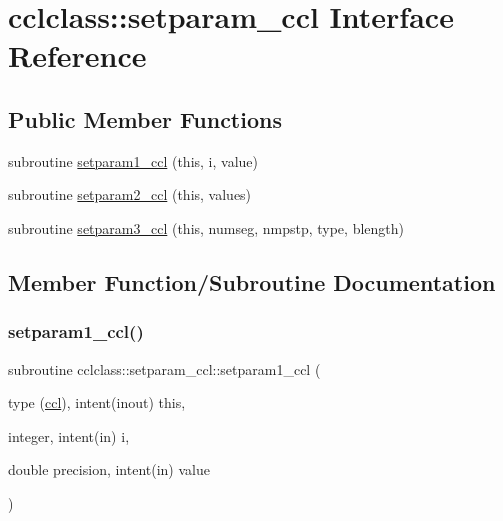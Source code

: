 \hypertarget{interfacecclclass_1_1setparam__ccl}{}\section{cclclass\+::setparam\+\_\+ccl Interface Reference}
\label{interfacecclclass_1_1setparam__ccl}
\subsection*{Public Member Functions}
\begin{DoxyCompactItemize}
\item 
subroutine \mbox{\hyperlink{interfacecclclass_1_1setparam__ccl_a3214f1704a32f32833b333495742befe}{setparam1\+\_\+ccl}} (this, i, value)
\item 
subroutine \mbox{\hyperlink{interfacecclclass_1_1setparam__ccl_a7221337eb59d3a666420ae8fc1878f9d}{setparam2\+\_\+ccl}} (this, values)
\item 
subroutine \mbox{\hyperlink{interfacecclclass_1_1setparam__ccl_a3cee72fa39bab552f147f7adb9ea942e}{setparam3\+\_\+ccl}} (this, numseg, nmpstp, type, blength)
\end{DoxyCompactItemize}


\subsection{Member Function/\+Subroutine Documentation}
\mbox{\label{interfacecclclass_1_1setparam__ccl_a3214f1704a32f32833b333495742befe}} 
\subsubsection{\texorpdfstring{setparam1\_ccl()}{setparam1\_ccl()}}
{\footnotesize\ttfamily subroutine cclclass\+::setparam\+\_\+ccl\+::setparam1\+\_\+ccl (\begin{DoxyParamCaption}\item[{type (\mbox{\hyperlink{namespacecclclass_structcclclass_1_1ccl}{ccl}}), intent(inout)}]{this,  }\item[{integer, intent(in)}]{i,  }\item[{double precision, intent(in)}]{value }\end{DoxyParamCaption})}

